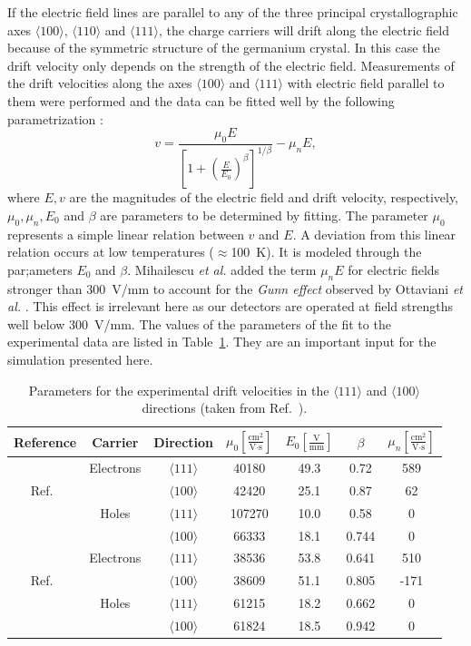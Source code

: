 If the electric field lines are parallel to any of the three principal
crystallographic axes $\langle 100 \rangle$, $\langle 110 \rangle$ and
$\langle 111 \rangle$, the charge carriers will drift along the
electric field because of the symmetric structure of the germanium
crystal. In this case the drift velocity only depends on the strength
of the electric field. Measurements of the drift velocities along the
axes $\langle 100 \rangle$ and $\langle 111 \rangle$ with electric
field parallel to them were performed and the data can be fitted well
by the following parametrization \cite{Kno99}:
\begin{equation} 
\label{eq:pss:para} 
v = \frac{\mu_{0}E}{[1+(\frac{E}{E_{0}})^{\beta}]^{1/\beta}} - \mu_{n}E, 
\end{equation} 
where $E, v$ are the magnitudes of the electric field and drift
velocity, respectively, $\mu_{0}, \mu_{n}, E_{0}$ and $\beta$ are
parameters to be determined by fitting. The parameter $\mu_{0}$
represents a simple linear relation between $v$ and $E$. A deviation
from this linear relation occurs at low temperatures
($\approx$100~K). It is modeled through the par;ameters $E_{0}$ and
$\beta$. Mihailescu \textit{et al.} \cite{miha} added the term
$\mu_{n}E$ for electric fields stronger than 300~V/mm to account for
the \emph{Gunn effect} observed by Ottaviani \textit{et al.}
\cite{otta}. This effect is irrelevant here as our detectors are
operated at field strengths well below 300~V/mm. The values of the
parameters of the fit to the experimental data are listed in
Table~\ref{tab:pss:pars}. They are an important input for the
simulation presented here.
 
\begin{table}[tbhp] 
\centering 
\caption{Parameters for the experimental drift velocities in the $\langle111\rangle$ and $\langle 100 \rangle$ directions (taken from Ref.~\cite{bart}).} 
\label{tab:pss:pars} 
\begin{tabular*}{\textwidth}{ccccccc}\hline\hline 
Reference & Carrier & Direction & $\mu_{0} \left[ \frac{\mbox{cm}^{2}}{\mbox{V}\cdot\mbox{s}} \right]$ & $E_{0} \left[ \frac{\mbox{V}}{\mbox{mm}} \right]$ & $\beta$ & $\mu_{n} \left[ \frac{\mbox{cm}^{2}}{\mbox{V}\cdot\mbox{s}} \right]$ \\\hline 
& Electrons & $\langle111\rangle$ & 40180 & 49.3 & 0.72 & 589 \\ 
Ref.~\cite{miha}& & $\langle100\rangle$ & 42420 & 25.1 & 0.87 & 62\\ 
& Holes & $\langle111\rangle$ & 107270 & 10.0 & 0.58 & 0 \\ 
& & $\langle100\rangle$ & 66333 & 18.1 & 0.744 & 0 \\\hline 
& Electrons & $\langle111\rangle$ & 38536 & 53.8 & 0.641 & 510 \\ 
Ref.~\cite{bart}& & $\langle100\rangle$ & 38609 & 51.1 & 0.805 & -171\\  
& Holes & $\langle111\rangle$ & 61215 & 18.2 & 0.662 & 0 \\ 
& & $\langle100\rangle$ & 61824 & 18.5 & 0.942 & 0 \\\hline\hline 
\end{tabular*} 
\end{table} 
 
